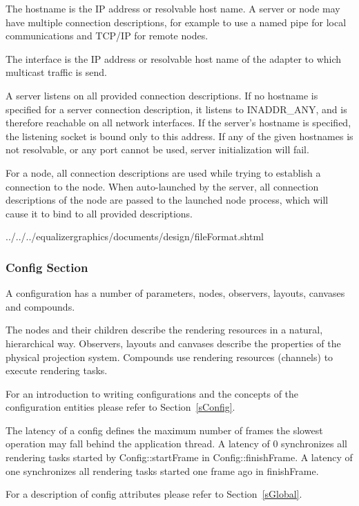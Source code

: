 \documentclass[10pt,a4]{scrartcl}
\newcommand{\sref}[1]{Section~\ref{#1}}
\begin{document}
The hostname is the IP address or resolvable host name. A server or
node may have multiple connection descriptions, for example to use a
named pipe for local communications and TCP/IP for remote nodes.

The interface is the IP address or resolvable host name of the adapter to which
multicast traffic is send.

A server listens on all provided connection descriptions. If no hostname
is specified for a server connection description, it listens to
INADDR\_ANY, and is therefore reachable on all network interfaces. If
the server's hostname is specified, the listening socket is bound only
to this address. If any of the given hostnames is not resolvable, or any
port cannot be used, server initialization will fail.

For a node, all connection descriptions are used while trying to
establish a connection to the node. When auto-launched by the server,
all connection descriptions of the node are passed to the launched node
process, which will cause it to bind to all provided descriptions.

{\footnotesize
  {../../../equalizergraphics/documents/design/fileFormat.shtml}}

\subsubsection{Config Section}

A configuration has a number of parameters, nodes, observers, layouts,
canvases and compounds.

The nodes and their children describe the rendering resources in a
natural, hierarchical way. Observers, layouts and canvases describe the
properties of the physical projection system. Compounds use rendering
resources (channels) to execute rendering tasks.

For an introduction to writing configurations and the concepts of the
configuration entities please refer to \sref{sConfig}.

The latency of a config defines the maximum number of frames the
slowest operation may fall behind the application thread. A latency of 0
synchronizes all rendering tasks started by \textsf{Config::startFrame}
in \textsf{Config::finishFrame}. A latency of one synchronizes all
rendering tasks started one frame ago in \textsf{finishFrame}.

For a description of config attributes please refer to \sref{sGlobal}.
\end{document}
